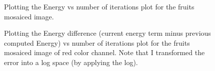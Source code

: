\documentclass{paper}
\begin{document}
\begin{figure}[H]
\begin{center}
\end{center}
\caption{Plotting the Energy vs number of iterations plot for the fruits mosaiced image.}
\label{fig:energy_vs_iterations}
\end{figure}

\begin{figure}[H]
\begin{center}
\end{center}
\caption{Plotting the Energy difference (current energy term minus previous computed Energy) vs number of iterations plot for the fruits mosaiced image of red color channel. Note that I transformed the error into a log space (by applying the log).}
\label{fig:log_diff_energy_vs_iterations}
\end{figure}
\end{document}
